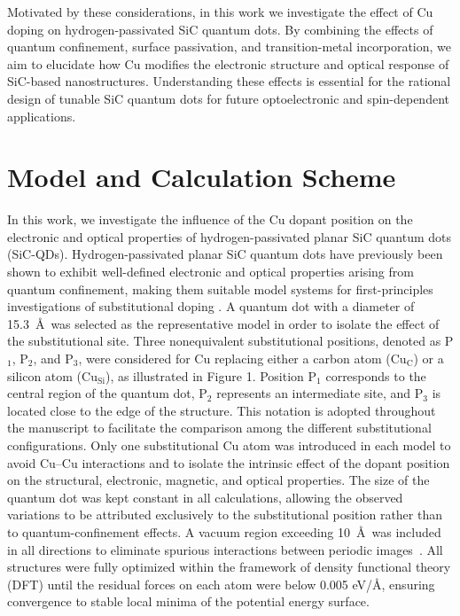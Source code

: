 \documentclass[11pt]{article} %
\begin{document}
Motivated by these considerations, in this work we investigate the effect of Cu doping on hydrogen-passivated SiC quantum dots. By combining the effects of quantum confinement, surface passivation, and transition-metal incorporation, we aim to elucidate how Cu modifies the electronic structure and optical response of SiC-based nanostructures. Understanding these effects is essential for the rational design of tunable SiC quantum dots for future optoelectronic and spin-dependent applications.

\section{Model and Calculation Scheme}
In this work, we investigate the influence of the Cu dopant position on the electronic and optical properties of hydrogen-passivated planar SiC quantum dots (SiC-QDs). Hydrogen-passivated planar SiC quantum dots have previously been shown to exhibit well-defined electronic and
optical properties arising from quantum confinement, making them suitable model systems for first-principles investigations of substitutional doping \cite{Rupali}. A quantum dot with a diameter of 15.3~\AA\ was selected as the representative model in order to isolate the effect of the substitutional site.
 Three nonequivalent substitutional positions, denoted as P$_{1}$, P$_{2}$, and P$_{3}$, were considered for Cu replacing either a carbon atom (Cu$_\mathrm{C}$) or a silicon atom (Cu$_\mathrm{Si}$), as illustrated in Figure 1. Position P$_{1}$ corresponds to the central region of the quantum dot, P$_{2}$ represents an intermediate site, and P$_{3}$ is located close to the edge of the structure. This notation is adopted throughout the manuscript to facilitate the comparison among the different substitutional configurations.
Only one substitutional Cu atom was introduced in each model to avoid Cu--Cu interactions and to isolate the intrinsic effect of the dopant position on the structural, electronic, magnetic, and optical properties. The size of the quantum dot was kept constant in all calculations, allowing the observed variations to be attributed exclusively to the substitutional position rather than to quantum-confinement effects.  A vacuum region exceeding 10~\AA\ was included in all directions to eliminate spurious interactions between periodic images~\cite{PhysRevB.73.205119}.
All structures were fully optimized within the framework of density functional theory (DFT) until the residual forces on each atom were below 0.005 eV/\AA, ensuring convergence to stable local minima of the potential energy surface.
\end{document}
